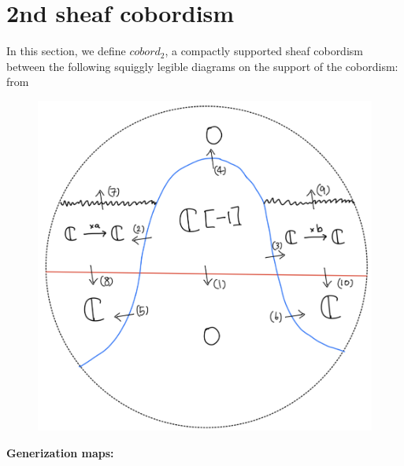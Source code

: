 \section{2nd sheaf cobordism}
In this section, we define $cobord_2$, a compactly supported sheaf cobordism between the following squiggly legible diagrams on the support of the cobordism:\\
from
\begin{figure}[H]
    \centering
    \includegraphics[scale = 0.45]{diagrams/lemma2/29.png} 
    \caption{}
    \label{fig:your-label}
\end{figure}
\textbf{Generization maps:}
